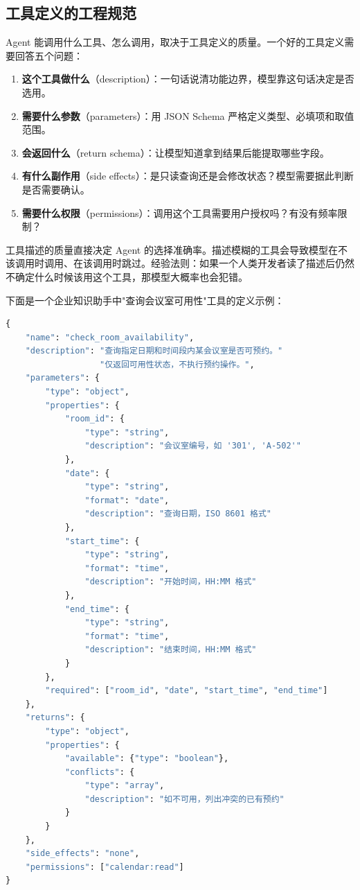 \subsection{工具定义的工程规范}
Agent 能调用什么工具、怎么调用，取决于工具定义的质量。一个好的工具定义需要回答五个问题：

\begin{enumerate}
  \item \textbf{这个工具做什么}（description）：一句话说清功能边界，模型靠这句话决定是否选用。
  \item \textbf{需要什么参数}（parameters）：用 JSON Schema 严格定义类型、必填项和取值范围。
  \item \textbf{会返回什么}（return schema）：让模型知道拿到结果后能提取哪些字段。
  \item \textbf{有什么副作用}（side effects）：是只读查询还是会修改状态？模型需要据此判断是否需要确认。
  \item \textbf{需要什么权限}（permissions）：调用这个工具需要用户授权吗？有没有频率限制？
\end{enumerate}

\begin{note}
工具描述的质量直接决定 Agent 的选择准确率。描述模糊的工具会导致模型在不该调用时调用、在该调用时跳过。经验法则：如果一个人类开发者读了描述后仍然不确定什么时候该用这个工具，那模型大概率也会犯错。
\end{note}

下面是一个企业知识助手中"查询会议室可用性"工具的定义示例：

\begin{lstlisting}[language=Python]
{
    "name": "check_room_availability",
    "description": "查询指定日期和时间段内某会议室是否可预约。"
                   "仅返回可用性状态，不执行预约操作。",
    "parameters": {
        "type": "object",
        "properties": {
            "room_id": {
                "type": "string",
                "description": "会议室编号，如 '301', 'A-502'"
            },
            "date": {
                "type": "string",
                "format": "date",
                "description": "查询日期，ISO 8601 格式"
            },
            "start_time": {
                "type": "string",
                "format": "time",
                "description": "开始时间，HH:MM 格式"
            },
            "end_time": {
                "type": "string",
                "format": "time",
                "description": "结束时间，HH:MM 格式"
            }
        },
        "required": ["room_id", "date", "start_time", "end_time"]
    },
    "returns": {
        "type": "object",
        "properties": {
            "available": {"type": "boolean"},
            "conflicts": {
                "type": "array",
                "description": "如不可用，列出冲突的已有预约"
            }
        }
    },
    "side_effects": "none",
    "permissions": ["calendar:read"]
}
\end{lstlisting}

